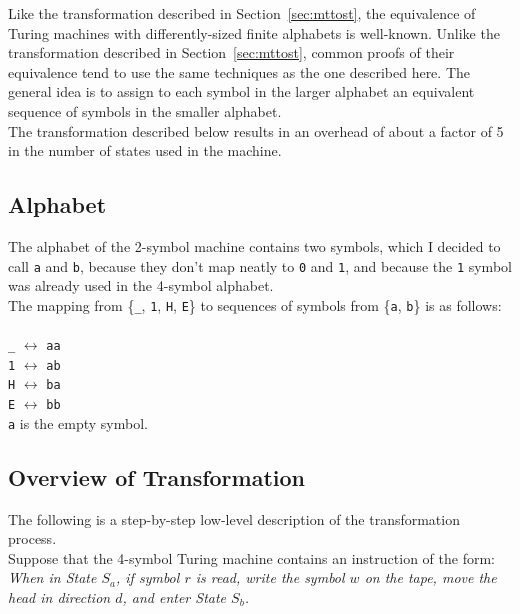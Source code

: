 \documentclass[11pt]{report}
\begin{document}
Like the transformation described in Section~\ref{sec:mttost}, the equivalence of Turing machines with differently-sized finite alphabets is well-known. Unlike the transformation described in Section~\ref{sec:mttost}, common proofs of their equivalence tend to use the same techniques as the one described here. The general idea is to assign to each symbol in the larger alphabet an equivalent sequence of symbols in the smaller alphabet. \\

The transformation described below results in an overhead of about a factor of 5 in the number of states used in the machine.

\subsection{Alphabet}

The alphabet of the 2-symbol machine contains two symbols, which I decided to call \texttt{a} and \texttt{b}, because they don't map neatly to \texttt{0} and \texttt{1}, and because the \texttt{1} symbol was already used in the 4-symbol alphabet. \\

The mapping from \{\texttt{\_}, \texttt{1}, \texttt{H}, \texttt{E}\} to sequences of symbols from \{\texttt{a}, \texttt{b}\} is as follows: \\ \\
\texttt{\_} $\leftrightarrow$ \texttt{aa} \\
\texttt{1} $\leftrightarrow$ \texttt{ab} \\
\texttt{H} $\leftrightarrow$ \texttt{ba} \\
\texttt{E} $\leftrightarrow$ \texttt{bb} \\

\texttt{a} is the empty symbol.

\subsection{Overview of Transformation \label{sec:mstotssteps}}

The following is a step-by-step low-level description of the transformation process. \\

Suppose that the 4-symbol Turing machine contains an instruction of the form: \\

\emph{When in State $S_a$, if symbol $r$ is read, write the symbol $w$ on the tape, move the head in direction $d$, and enter State $S_b$.} \\
\end{document}
